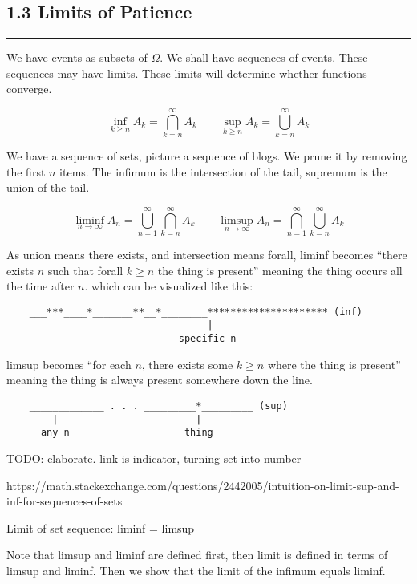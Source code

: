 \documentclass{article}
\begin{document}
\begin{flushleft}
\section*{1.3 Limits of Patience}
\bigbreak
\hrule
\bigbreak

We have events as subsets of $\Omega$. We shall have sequences of events. These sequences may have limits. These limits will determine whether functions converge. 

\bigbreak

\[
    \inf_{k \geq n} A_k = \bigcap_{k = n}^{\infty} A_k \qquad \sup_{k \geq n} A_k = \bigcup_{k = n}^{\infty} A_k
\]

We have a sequence of sets, picture a sequence of blogs. We prune it by removing the first $n$ items. The infimum is the intersection of the tail, supremum is the union of the tail.

\[
    \liminf_{n \rightarrow \infty} A_n = \bigcup_{n=1}^{\infty} \bigcap_{k=n}^{\infty} A_k \qquad \limsup_{n \rightarrow \infty} A_n = \bigcap_{n=1}^{\infty} \bigcup_{k=n}^{\infty} A_k
\]

As union means there exists, and intersection means forall, liminf becomes ``there exists $n$ such that forall $k \geq n$ the thing is present'' meaning the thing occurs all the time after $n$. which can be visualized like this:

\begin{verbatim}
    ___***____*_______**__*________********************* (inf)
                                   |
                              specific n
\end{verbatim}

limsup becomes ``for each $n$, there exists some $k \geq n$ where the thing is present'' meaning the thing is always present somewhere down the line. 

\begin{verbatim}
    _____________ . . . _________*_________ (sup)
        |                        |
      any n                    thing
\end{verbatim}

TODO: elaborate. link is indicator, turning set into number

https://math.stackexchange.com/questions/2442005/intuition-on-limit-sup-and-inf-for-sequences-of-sets

\bigbreak

Limit of set sequence: liminf = limsup

\bigbreak

Note that limsup and liminf are defined first, then limit is defined in terms of limsup and liminf. Then we show that the limit of the infimum equals liminf. 



\end{flushleft}
\end{document}
